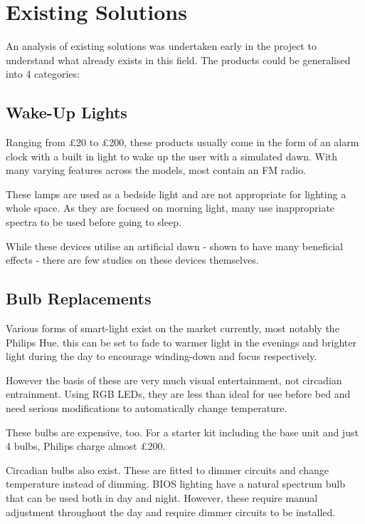 \section{Existing Solutions}
\label{Lit:solutions}

An analysis of existing solutions was undertaken early in the project to understand what already exists in this field. The products could be generalised into 4 categories:

\subsection{Wake-Up Lights}

Ranging from £20 to £200, these products usually come in the form of an alarm clock with a built in light to wake up the user with a simulated dawn. With many varying features across the models, most contain an FM radio.

These lamps are used as a bedside light and are not appropriate for lighting a whole space. As they are focused on morning light, many use inappropriate spectra to be used before going to sleep.

 While these devices utilise an artificial dawn - shown to have many beneficial effects - there are few studies on these devices themselves.

\subsection{Bulb Replacements}

Various forms of smart-light exist on the market currently, most notably the Philips Hue. this can be set to fade to warmer light in the evenings and brighter light during the day to encourage winding-down and focus respectively. 

However the basis of these are very much visual entertainment, not circadian entrainment. Using RGB LEDs, they are less than ideal for use before bed and need serious modifications to automatically change temperature.

These bulbs are expensive, too.  For a starter kit including the base unit and just 4 bulbs, Philips charge almost £200.

Circadian bulbs also exist. These are fitted to dimmer circuits and change temperature instead of dimming. BIOS lighting have a natural spectrum bulb that can be used both in day and night. However, these require manual adjustment throughout the day and require dimmer circuits to be installed.

